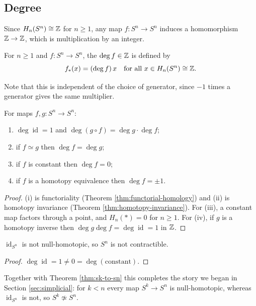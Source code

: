 \documentclass[a4paper]{scrartcl}
\newcommand{\id}{\operatorname{id}}
\begin{document}
\subsection{Degree}

Since $H_n(S^n)\cong\mathbb{Z}$ for $n \geq 1$, any map $f: S^n \to S^n$ induces a homomorphism
$\mathbb{Z}\to\mathbb{Z}$, which is multiplication by an integer.

\begin{definition}[Degree]
	For $n \geq 1$ and $f: S^n \to S^n$, the  $\deg f \in \mathbb{Z}$ is defined by
	$$
	f_*(x) = (\deg f)\, x \quad \text{for all } x \in H_n(S^n)\cong\mathbb{Z}.
	$$
\end{definition}

Note that this is independent of the choice of generator, since $-1$ times a generator
gives the same multiplier.

\begin{proposition} \label{prop:degree-props}
	For maps $f, g: S^n \to S^n$:
	\begin{enumerate}
		\item $\deg\id = 1$ and $\deg(g\circ f) = \deg g \cdot \deg f$;
		\item if $f \simeq g$ then $\deg f = \deg g$;
		\item if $f$ is constant then $\deg f = 0$;
		\item if $f$ is a homotopy equivalence then $\deg f = \pm 1$.
	\end{enumerate}
\end{proposition}
\begin{proof}
	(i) is functoriality (Theorem \ref{thm:functorial-homology}) and (ii) is homotopy invariance (Theorem \ref{thm:homotopy-invariance}). For (iii), a constant map factors through a point, and $H_n(*) = 0$ for $n \geq 1$. For (iv), if $g$ is a homotopy inverse then $\deg g \deg f = \deg\id = 1$ in $\mathbb{Z}$.
\end{proof}

\begin{corollary}
	$\id_{S^n}$ is not null-homotopic, so $S^n$ is not contractible.
\end{corollary}
\begin{proof}
	$\deg \id = 1 \neq 0 = \deg(\text{constant})$.
\end{proof}

Together with Theorem \ref{thm:sk-to-sn} this completes the story we began in Section
\ref{sec:simplicial}: for $k < n$ every map $S^k \to S^n$ is null-homotopic, whereas
$\id_{S^n}$ is not, so $S^k \not\simeq S^n$.
\end{document}
